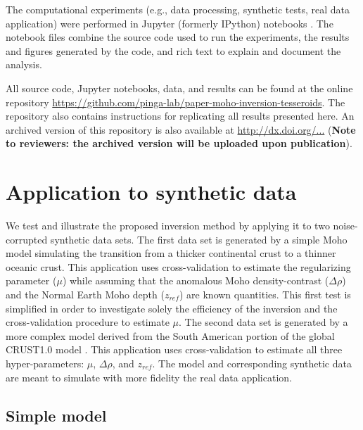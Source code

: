 \documentclass[extra,mreferee]{gji}
\begin{document}
The computational experiments
(e.g., data processing, synthetic tests, real data application)
were performed in
Jupyter (formerly IPython) notebooks
\citep[][ \url{http://jupyter.org/}]{perez2007}.
The notebook files combine the source code used to run the experiments,
the results and figures generated by the code,
and rich text to explain and document the analysis.

All source code, Jupyter notebooks, data, and results
can be found at the online repository
\url{https://github.com/pinga-lab/paper-moho-inversion-tesseroids}.
The repository also contains instructions for replicating all results presented
here.
An archived version of this repository is also available at
\url{http://dx.doi.org/...}
(\textbf{Note to reviewers: the archived version will be uploaded upon
publication}).


\section{Application to synthetic data}

We test and illustrate the proposed inversion method
by applying it to two noise-corrupted synthetic data sets.
The first data set is generated by a simple Moho model simulating the transition
from a thicker continental crust to a thinner oceanic crust.
This application uses cross-validation to estimate the regularizing parameter
($\mu$) while assuming that the anomalous Moho density-contrast ($\Delta\rho$)
and the Normal Earth Moho depth ($z_{ref}$) are known quantities.
This first test is simplified in order to investigate solely
the efficiency of the inversion and
the cross-validation procedure to estimate $\mu$.
The second data set is generated by a more complex model derived from
the South American portion of the global CRUST1.0 model \citep{laske2013}.
This application uses cross-validation to estimate all three hyper-parameters:
$\mu$, $\Delta\rho$, and $z_{ref}$.
The model and corresponding synthetic data are meant to simulate
with more fidelity the real data application.


\subsection{Simple model}\label{sec:simple-synthetic}
\end{document}
